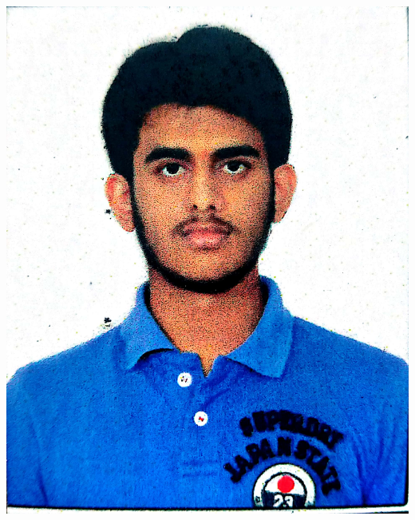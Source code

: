 \documentclass{res}
\begin{document}
 
	\begin{flushright}                                      
	\includegraphics[scale=0.03
	]{Myphoto}
	\end{flushright}
	\address{\bf  PRESENT ADDRESS\\YASHMITHA LUXURY PG FOR GENTS\\Krishna garden Road BEML Layout 7th Stage\\Bangalore-59}
	\address{\bf PERMANENT ADDRESS \\No.1426/2 SRI RANGA\\Opposite to Morden Opticals\\ Harsha Mahal Road \\Hassan-573201}
	
\end{document}
